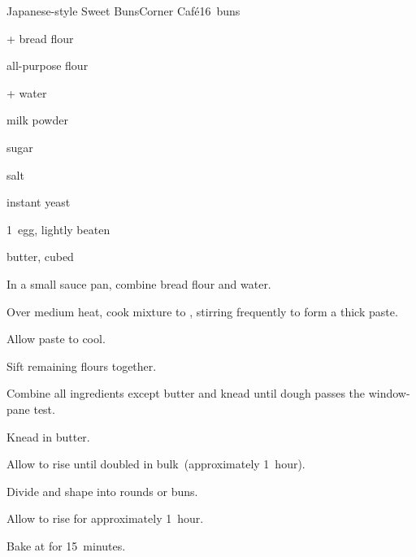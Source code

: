 \begin{recipe}{Japanese-style Sweet Buns}{Corner Caf\'e}{16~buns}

\begin{ingredients}
\item {} +  bread flour
\item {} all-purpose flour
\item {} +  water
\item {} milk powder
\item {} sugar
\item \tp{\threequarter} salt
\item \tp{2\half} instant yeast
\item 1~egg, lightly beaten
\item {} butter, cubed
\end{ingredients}

\begin{directions}
\item In a small sauce pan, combine  bread flour and  water.
\item Over medium heat, cook mixture to , stirring frequently to form a thick paste.
\item Allow paste to cool.
\item Sift remaining flours together.
\item Combine all ingredients except butter and knead until dough passes the window-pane test.
\item Knead in butter.
\item Allow to rise until doubled in bulk~(approximately 1~hour).
\item Divide and shape into rounds or buns.
\item Allow to rise for approximately 1~hour.
\item Bake at  for 15~minutes.
\end{directions}

\end{recipe}

